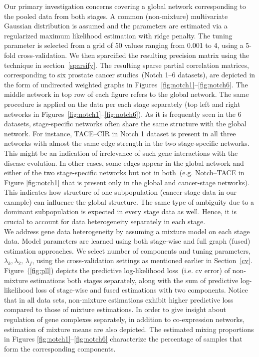 \documentclass[10pt]{article}
\begin{document}
Our primary investigation concerns covering a global network corresponding to the pooled data from both stages. A common (non-mixture) multivariate Gaussian distribution is assumed and the parameters are estimated via a regularized maximum likelihood estimation with ridge penalty. The tuning parameter is selected from a grid of 50 values ranging from 0.001 to 4, using a 5-fold cross-validation.  We then sparcified the resulting precision matrix using the technique in section~\ref{sparsify}. The resulting sparse partial correlation matrices, corresponding to six prostate cancer studies~(Notch 1--6 datasets), are depicted in the form of undirected weighted graphs in Figures~\ref{fig:notch1}--\ref{fig:notch6}. The middle network in top row of each figure refers to the global network. The same procedure is applied on the data per each stage separately (top left and right networks in Figures~\ref{fig:notch1}--\ref{fig:notch6}). As it is frequently seen in the 6 datasets, stage-specific networks often share the same structure with the global network. For instance, TACE--CIR in Notch 1 dataset is present in all three networks with almost the same edge strength in the two stage-specific networks. This might be an indication of irrelevance of such gene interactions with the disease evolution. In other cases, some edges appear in the global network and either of the two stage-specific networks but not in both~(e.g. Notch--TACE in Figure \ref{fig:notch1} that is present only in the global and cancer-stage networks). This indicates how structure of one subpopulation (cancer-stage data in our example) can influence the global structure. The same type of ambiguity due to a dominant subpopulation is expected in every stage data as well. Hence, it is crucial to account for data heterogeneity separately in each stage.  
\\


We address gene data heterogeneity by assuming a mixture model on each stage data. Model parameters are learned using both stage-wise and full graph (fused) estimation approaches. We select number of components and tuning parameters, $\lambda_k, \lambda_2,\, \lambda_f$, using the cross-validation settings as mentioned earlier in Section~\ref{cv}. Figure~(\ref{fig:pll}) depicts the predictive log-likelihood loss~(i.e. cv error) of non-mixture estimations  both stages separately, along with the sum of predictive log-likelihood loss of stage-wise and fused estimations with two components. Notice that in all data sets, non-mixture estimations exhibit higher predictive loss compared to those of mixture estimations.
 In order to give insight about regulation of gene complexes separately, in addition to co-expression networks, estimation of mixture means are also depicted. The estimated mixing proportions in Figures \ref{fig:notch1}--\ref{fig:notch6} characterize the percentage of samples that form the corresponding components.  %
\end{document}
